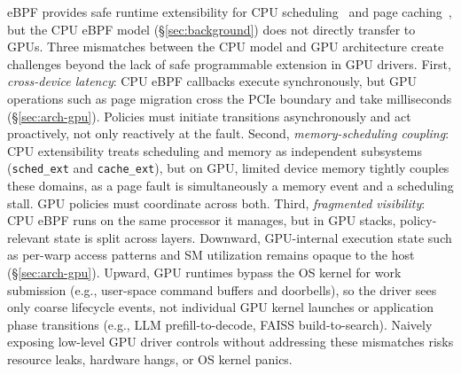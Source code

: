 eBPF provides safe runtime extensibility for CPU scheduling~\cite{schedext-docs} and page caching~\cite{zussman2025cache_ext}, but the CPU eBPF model (\S\ref{sec:background}) does not directly transfer to GPUs. Three mismatches between the CPU model and GPU architecture create challenges beyond the lack of safe programmable extension in GPU drivers.
First, \emph{cross-device latency}: CPU eBPF callbacks execute synchronously, but GPU operations such as page migration cross the PCIe boundary and take milliseconds (\S\ref{sec:arch-gpu}). Policies must initiate transitions asynchronously and act proactively, not only reactively at the fault.
Second, \emph{memory-scheduling coupling}: CPU extensibility treats scheduling and memory as independent subsystems (\texttt{sched\_ext} and \texttt{cache\_ext}), but on GPU, limited device memory tightly couples these domains, as a page fault is simultaneously a memory event and a scheduling stall. GPU policies must coordinate across both.
Third, \emph{fragmented visibility}: CPU eBPF runs on the same processor it manages, but in GPU stacks, policy-relevant state is split across layers. Downward, GPU-internal execution state such as per-warp access patterns and SM utilization remains opaque to the host (\S\ref{sec:arch-gpu}). Upward, GPU runtimes bypass the OS kernel for work submission (e.g., user-space command buffers and doorbells), so the driver sees only coarse lifecycle events, not individual GPU kernel launches or application phase transitions (e.g., LLM prefill-to-decode, FAISS build-to-search).
Naively exposing low-level GPU driver controls without addressing these mismatches risks resource leaks, hardware hangs, or OS kernel panics.


